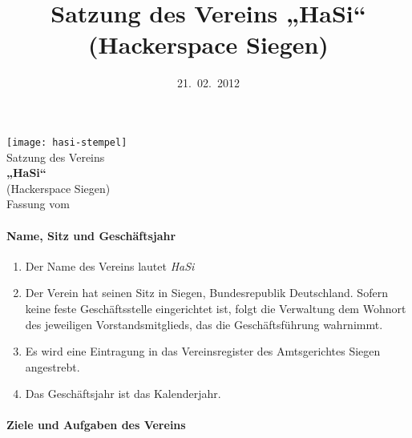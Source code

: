 \documentclass[12pt]{satzung}
\title{Satzung des Vereins „HaSi“ (Hackerspace Siegen)}
\date{21.~02.~2012}
\begin{document}
\begin{center}
\texttt{[image: hasi-stempel]}\\
\vspace{6mm}
{\large Satzung des Vereins}\\
\vspace{3mm}
{\Large\bf „HaSi“}\\
\vspace{2mm}
{\normalsize (Hackerspace Siegen)}\\
\vspace{4mm}
{\small Fassung vom~\makeatletter\@date\makeatother }
\end{center}

\vspace{8mm}

\setcounter{tocdepth}{4}
\tableofcontents

\newpage

\paragraph{Name, Sitz und Geschäftsjahr}
\label{sec:name-sitz-geschaeftsjahr}

\begin{enumerate}[(1)]
\item Der Name des Vereins lautet \emph{HaSi}

\item Der Verein hat seinen Sitz in Siegen, Bundesrepublik Deutschland. Sofern keine feste Geschäftsstelle eingerichtet ist, folgt die Verwaltung dem Wohnort des jeweiligen Vorstandsmitglieds, das die Geschäftsführung wahrnimmt.

\item Es wird eine Eintragung in das Vereinsregister des Amtsgerichtes Siegen angestrebt. 


\item Das Geschäftsjahr ist das Kalenderjahr. 

\end{enumerate}


\paragraph{Ziele und Aufgaben des Vereins}
\label{sec:ziele-des-vereins}
\end{document}
